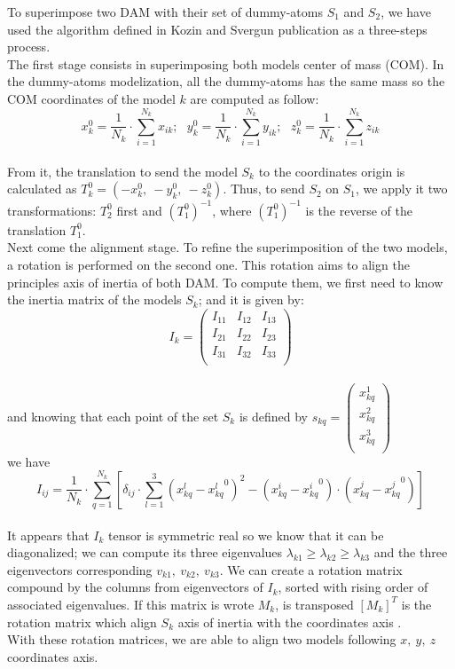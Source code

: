 \documentclass[a4paper, 11pt]{report}
\begin{document}
To superimpose two DAM with their set of dummy-atoms $S_{1}$ and 
$S_{2}$, we have used the algorithm defined in Kozin and Svergun 
publication \cite{supcomb} as a three-steps process.\\

The first stage consists in superimposing both models center of mass 
(COM). 
In the dummy-atoms modelization, all the dummy-atoms has the same mass 
so the COM coordinates of the model $k$ are computed as follow:
\[
x_{k}^0 = \frac{1}{N_{k}} \cdot \sum\limits_{i=1}^{N_{k}} x_{ik};\ \ \ 
y_{k}^0 = \frac{1}{N_{k}} \cdot \sum\limits_{i=1}^{N_{k}} y_{ik};\ \ \ 
z_{k}^0 = \frac{1}{N_{k}} \cdot \sum\limits_{i=1}^{N_{k}} z_{ik}
\]\\
From it, the translation to send the model $S_{k}$ to the coordinates 
origin is calculated as $T_{k}^0 = (-x_{k}^0,\ -y_{k}^0,\ -z_{k}^0)$. 
Thus, to send $S_{2}$ on $S_{1}$, we apply it two transformations: 
$T_{2}^0$ first and $(T_{1}^0)^{-1}$, where $(T_{1}^0)^{-1}$ is the 
reverse of the translation $T_{1}^0$.\\

Next come the alignment stage. 
To refine the superimposition of the two models, a rotation is 
performed on the second one. 
This rotation aims to align the principles axis of inertia of both 
DAM. 
To compute them, we first need to know the inertia matrix of the 
models $S_{k}$; and it is given by:
\[
I_{k}=
\begin{pmatrix}
 I_{11} & I_{12} & I_{13} \\
 I_{21} & I_{22} & I_{23} \\
 I_{31} & I_{32} & I_{33} \\
\end{pmatrix}
\]\\
and knowing that each point of the set $S_{k}$ is defined by
$
s_{kq}=
\begin{pmatrix}
 x_{kq}^1 \\
 x_{kq}^2 \\
 x_{kq}^3 \\
\end{pmatrix}
$\\
we have
\[
I_{ij} = \frac{1}{N_{k}} \cdot \sum\limits_{q=1}^{N_{k}} 
[\delta_{ij} \cdot \sum\limits_{l=1}^3 
 (x_{kq}^l - {x_{kq}^l}^0)^2 -  (x_{kq}^i - {x_{kq}^i}^0) 
 \cdot (x_{kq}^j - {x_{kq}^j}^0)]
\]\\
It appears that $I_{k}$ tensor is symmetric real so we know that it 
can be diagonalized; we can compute its three eigenvalues 
$\lambda_{k1} \geq \lambda_{k2} \geq \lambda_{k3}$ and the three 
eigenvectors corresponding $v_{k1},\ v_{k2},\ v_{k3}$. 
We can create a rotation matrix compound by the columns from 
eigenvectors of $I_{k}$, sorted with rising order of associated 
eigenvalues. 
If this matrix is wrote $M_{k}$, is transposed $[M_{k}]^T$ is the 
rotation matrix which align $S_{k}$ axis of inertia with the 
coordinates axis \cite{supcomb}.\\
With these rotation matrices, we are able to align two models 
following $x,\ y,\ z$ coordinates axis.\\
\end{document}
